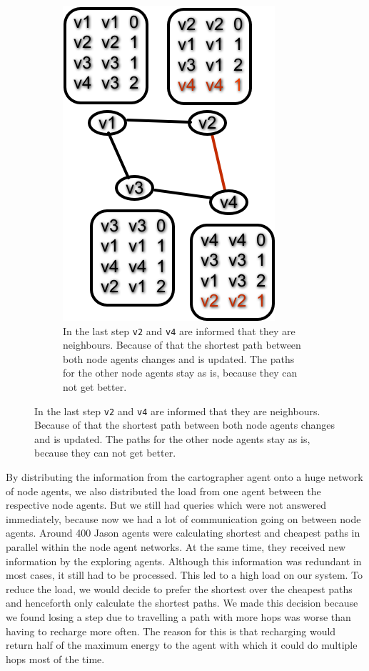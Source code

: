 \begin{figure}
\begin{subfigure}{.45\textwidth}
        \includegraphics[width=\textwidth] {images/dv5.png}
        \caption{In the last step \texttt{v2} and \texttt{v4} are informed that they are neighbours. Because of that the shortest path between both node agents changes and is updated. The paths for the other node agents stay as is, because they can not get better. }
    \end{subfigure}
\end{figure}

By distributing the information from the cartographer agent onto a huge network of node agents, we also distributed the load from one agent between the respective node agents.
But we still had queries which were not answered immediately, because now we had a lot of communication going on between node agents.
Around 400 Jason agents were calculating shortest and cheapest paths in parallel within the node agent networks.
At the same time, they received new information by the exploring agents.
Although this information was redundant in most cases, it still had to be processed.
This led to a high load on our system.
To reduce the load, we would decide to prefer the shortest over the cheapest paths and henceforth only calculate the shortest paths.
We made this decision because we found losing a step due to travelling a path with more hops was worse than having to recharge more often.
The reason for this is that recharging would return half of the maximum energy to the agent with which it could do multiple hops most of the time.

